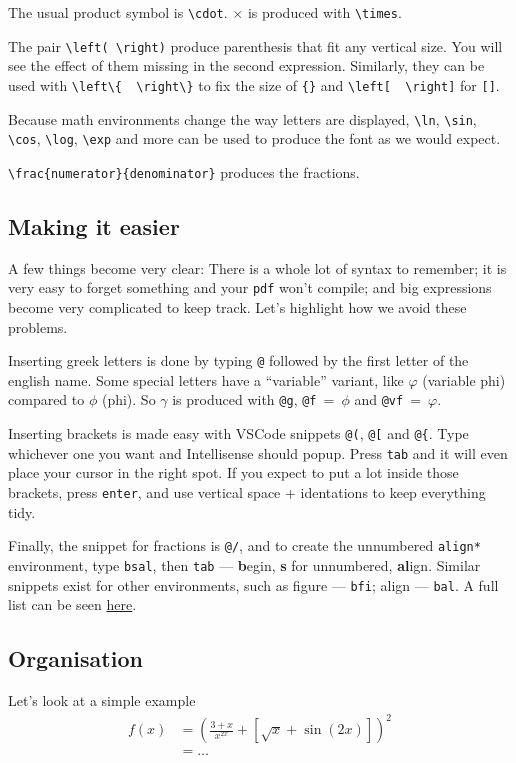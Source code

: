 The usual product symbol is \verb|\cdot|. \(\times\) is produced with \verb|\times|.

The pair \verb|\left( \right)| produce parenthesis that fit any vertical size.
You will see the effect of them missing in the second expression.
Similarly, they can be used with \verb|\left\{  \right\}| to fix the size of \verb|{}| and \verb|\left[  \right]| for \verb|[]|.

Because math environments change the way letters are displayed, \verb|\ln|, \verb|\sin|, \verb|\cos|, \verb|\log|, \verb|\exp| and more can be used to produce the font as we would expect. 

\verb|\frac{numerator}{denominator}| produces the fractions.

\subsection{Making it easier}
A few things become very clear: There is a whole lot of syntax to remember; it is very easy to forget something and your \texttt{pdf} won't compile; and big expressions become very complicated to keep track.
Let's highlight how we avoid these problems.

Inserting greek letters is done by typing \verb|@| followed by the first letter of the english name.
Some special letters have a ``variable'' variant, like \(\varphi\) (variable phi) compared to \(\phi\) (phi).
So \(\gamma\) is produced with \verb|@g|, \verb|@f|~=~\(\phi\) and \verb|@vf|~=~\(\varphi\). 

Inserting brackets is made easy with VSCode snippets \verb|@(|, \verb|@[| and \verb|@{|.
Type whichever one you want and Intellisense should popup.
Press \verb|tab| and it will even place your cursor in the right spot.
If you expect to put a lot inside those brackets, press \texttt{enter}, and use vertical space + identations to keep everything tidy.

Finally, the snippet for fractions is \verb|@/|, and to create the unnumbered \texttt{align*} environment, type \texttt{bsal}, then \texttt{tab} --- \textbf{b}egin, \textbf{s} for unnumbered, \textbf{al}ign.
Similar snippets exist for other environments, such as figure --- \texttt{bfi}; align --- \texttt{bal}.
A full list can be seen \href{https://github.com/James-Yu/LaTeX-Workshop/wiki/Snippets}{here}.

\subsection{Organisation}
Let's look at a simple example 
\begin{align*}
    f(x) &
        = {
            \left( 
                \frac{3+x}{x^{2x}}
                + \left[ 
                    \sqrt{x} + \sin(2x)
                \right]
            \right)
        }^2
    \\
    &= \dots
\end{align*}

